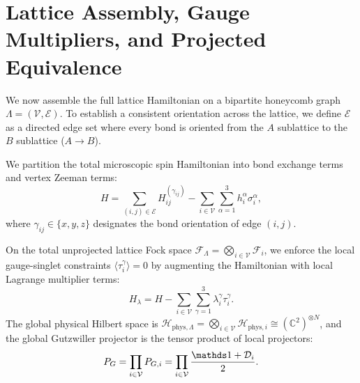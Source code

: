 \section{Lattice Assembly, Gauge Multipliers, and Projected Equivalence}
\label{sec:m1_1_quartic_hamiltonian}
We now assemble the full lattice Hamiltonian on a bipartite honeycomb graph $\Lambda = (\mathcal{V}, \mathcal{E})$. To establish a consistent orientation across the lattice, we define $\mathcal{E}$ as a directed edge set where every bond is oriented from the $A$ sublattice to the $B$ sublattice ($A \to B$).

We partition the total microscopic spin Hamiltonian into bond exchange terms and vertex Zeeman terms:
\begin{equation}
\label{eq:m1_1_spin_hamiltonian}
H = \sum_{(i,j) \in \mathcal{E}} H_{ij}^{(\gamma_{ij})} - \sum_{i \in \mathcal{V}} \sum_{\alpha=1}^3 h_i^\alpha \sigma_i^\alpha,
\end{equation}
where $\gamma_{ij} \in \{x, y, z\}$ designates the bond orientation of edge $(i,j)$.

On the total unprojected lattice Fock space $\mathcal{F}_{\Lambda} = \bigotimes_{i \in \mathcal{V}} \mathcal{F}_i$, we enforce the local gauge-singlet constraints $\langle \tau_i^\gamma \rangle = 0$ by augmenting the Hamiltonian with local Lagrange multiplier terms:
\begin{equation}
\label{eq:m1_1_H_lambda_full}
H_\lambda = H - \sum_{i \in \mathcal{V}} \sum_{\gamma=1}^3 \lambda_i^\gamma \tau_i^\gamma.
\end{equation}
The global physical Hilbert space is $\mathcal{H}_{\mathrm{phys}, \Lambda} = \bigotimes_{i \in \mathcal{V}} \mathcal{H}_{\mathrm{phys}, i} \cong (\mathbb{C}^2)^{\otimes N}$, and the global Gutzwiller projector is the tensor product of local projectors:
\begin{equation}
\label{eq:m1_1_global_gutzwiller}
P_G = \prod_{i \in \mathcal{V}} P_{G, i} = \prod_{i \in \mathcal{V}} \frac{\Id + \mathcal{D}_i}{2}.
\end{equation}


